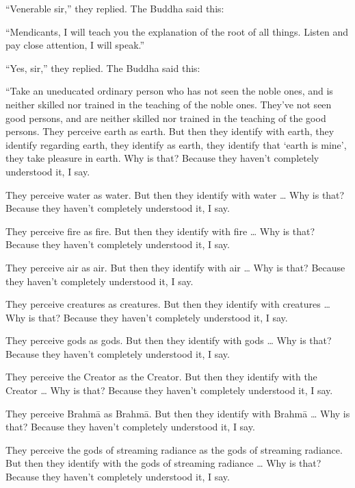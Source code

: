 \documentclass[12pt,openany]{book}%
\begin{document}
“Venerable sir,” they replied. The Buddha said this: 

“Mendicants, I will teach you the explanation of the root of all things. Listen and pay close attention, I will speak.” 

“Yes, sir,” they replied. The Buddha said this: 

“Take an uneducated ordinary person who has not seen the noble ones, and is neither skilled nor trained in the teaching of the noble ones. They’ve not seen good persons, and are neither skilled nor trained in the teaching of the good persons. They perceive earth as earth. But then they identify with earth, they identify regarding earth, they identify as earth, they identify that ‘earth is mine’, they take pleasure in earth. Why is that? Because they haven’t completely understood it, I say. 

They perceive water as water. But then they identify with water … Why is that? Because they haven’t completely understood it, I say. 

They perceive fire as fire. But then they identify with fire … Why is that? Because they haven’t completely understood it, I say. 

They perceive air as air. But then they identify with air … Why is that? Because they haven’t completely understood it, I say. 

They perceive creatures as creatures. But then they identify with creatures … Why is that? Because they haven’t completely understood it, I say. 

They perceive gods as gods. But then they identify with gods … Why is that? Because they haven’t completely understood it, I say. 

They perceive the Creator as the Creator. But then they identify with the Creator … Why is that? Because they haven’t completely understood it, I say. 

They perceive \textsanskrit{Brahmā} as \textsanskrit{Brahmā}. But then they identify with \textsanskrit{Brahmā} … Why is that? Because they haven’t completely understood it, I say. 

They perceive the gods of streaming radiance as the gods of streaming radiance. But then they identify with the gods of streaming radiance … Why is that? Because they haven’t completely understood it, I say. 
\end{document}
